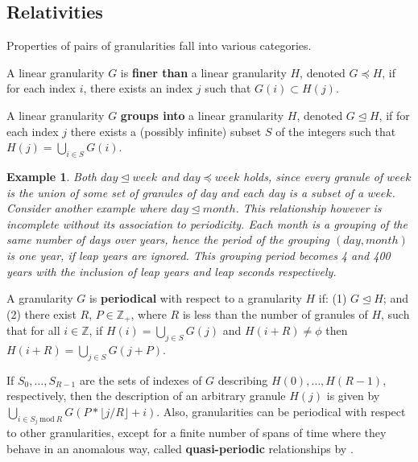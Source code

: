 \documentclass[12pt]{article}
\begin{document}
\hypertarget{relativities}{%
\subsection{Relativities}\label{relativities}}

Properties of pairs of granularities fall into various categories.

\begin{definition}\label{def:finerthan}
A linear granularity $G$ is {\bf finer than} a linear granularity $H$, denoted $G \preceq H$, if for each index $i$, there exists an index $j$ such that
$G(i) \subset H(j).$
\end{definition}

\begin{definition}\label{def:groupsinto}
A linear granularity $G$ {\bf groups into} a linear granularity $H$, denoted
$G \trianglelefteq H$, if for each index $j$ there exists a (possibly infinite) subset $S$ of the integers such that $H(j) = \bigcup_{i \in S}G(i).$
\end{definition}

\newtheorem*{example}{Example}

\begin{example}
{\rm Both $day \trianglelefteq week$ and $day \preceq week$ holds, since every granule of $week$ is the union of some set of granules of day and each day is a subset of a $week$. Consider another example where $day \trianglelefteq month$. This relationship however is incomplete without its association to periodicity. Each month is a grouping of the same number of days over years, hence the period of the grouping $(day, month)$ is one year, if leap years are ignored. This grouping period becomes 4 and 400 years with the inclusion of leap years and leap seconds respectively.}
\end{example}

\begin{definition}\label{def:periodical}
A granularity $G$ is {\bf periodical} with respect to a granularity $H$ if:
(1) $G \trianglelefteq H$; and
(2) there exist $R$, $P \in \mathbb{Z}_+$, where $R$ is less than the number of granules of $H$, such that for all $i \in \mathbb{Z}$, if $H(i) = \bigcup_{j \in S}G(j)$ and $H (i + R) \neq \phi$ then $H (i + R) = \bigcup_{j \in S} G(j + P)$.
\end{definition}

If \({S_0,\dots,S_{R-1}}\) are the sets of indexes of \(G\) describing
\(H(0), \dots, H(R - 1)\), respectively, then the description of an arbitrary granule \(H(j)\) is given by \(\bigcup_{i \in S_j ~\text{mod}~R}G(P*\lfloor j/R \rfloor + i)\). Also, granularities can be periodical with respect to other granularities, except for a finite number of spans of time where they behave in an anomalous way, called \textbf{quasi-periodic} relationships by \citet{Bettini2000-vy}.
\end{document}
